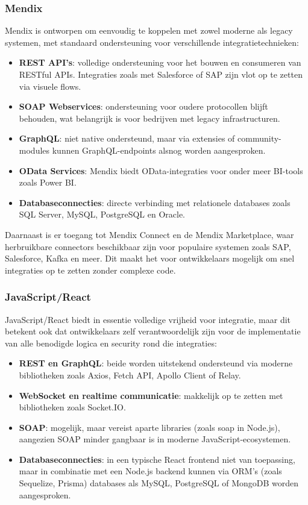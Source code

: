 \subsubsection{Mendix}

Mendix is ontworpen om eenvoudig te koppelen met zowel moderne als legacy systemen, met standaard ondersteuning voor verschillende integratietechnieken:
\begin{itemize}
    \item \textbf{REST \gls{API}'s}: volledige ondersteuning voor het bouwen en consumeren van RESTful APIs. Integraties zoals met Salesforce of SAP zijn vlot op te zetten via visuele flows.
    \item \textbf{SOAP Webservices}: ondersteuning voor oudere protocollen blijft behouden, wat belangrijk is voor bedrijven met legacy infrastructuren.
    \item \textbf{GraphQL}: niet native ondersteund, maar via extensies of community-modules kunnen GraphQL-endpoints alsnog worden aangesproken.
    \item \textbf{OData Services}: Mendix biedt OData-integraties voor onder meer BI-tools zoals Power BI.
    \item \textbf{Databaseconnecties}: directe verbinding met relationele databases zoals SQL Server, MySQL, PostgreSQL en Oracle.
\end{itemize}

Daarnaast is er toegang tot Mendix Connect en de Mendix Marketplace, waar herbruikbare connectors beschikbaar zijn voor populaire systemen zoals SAP, Salesforce, Kafka en meer. Dit maakt het voor ontwikkelaars mogelijk om snel integraties op te zetten zonder complexe code.

\subsubsection{JavaScript/React}

JavaScript/React biedt in essentie volledige vrijheid voor integratie, maar dit betekent ook dat ontwikkelaars zelf verantwoordelijk zijn voor de implementatie van alle benodigde logica en security rond die integraties:
\begin{itemize}
    \item \textbf{REST en GraphQL}: beide worden uitstekend ondersteund via moderne bibliotheken zoals Axios, Fetch API, Apollo Client of Relay.
    \item \textbf{WebSocket en realtime communicatie}: makkelijk op te zetten met bibliotheken zoals Socket.IO.
    \item \textbf{SOAP}: mogelijk, maar vereist aparte libraries (zoals soap in Node.js), aangezien SOAP minder gangbaar is in moderne JavaScript-ecosystemen.
    \item \textbf{Databaseconnecties}: in een typische React frontend niet van toepassing, maar in combinatie met een Node.js backend kunnen via ORM's (zoals Sequelize, Prisma) databases als MySQL, PostgreSQL of MongoDB worden aangesproken.
\end{itemize}

